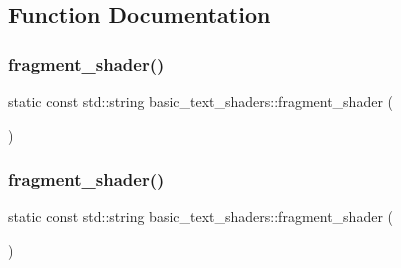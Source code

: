 \subsection{Function Documentation}
\mbox{\label{namespacebasic__text__shaders_a1b36935432456ef648cb7c3704d25a6d}} 
\subsubsection{\texorpdfstring{fragment\+\_\+shader()}{fragment\_shader()}\hspace{0.1cm}{\footnotesize\ttfamily [1/2]}}
{\footnotesize\ttfamily static const std\+::string basic\+\_\+text\+\_\+shaders\+::fragment\+\_\+shader (\begin{DoxyParamCaption}\item[{\{R\char`\"{}(\#version 450 corein vec2 Tex\+Coords;out vec4 color;uniform sampler2D text;uniform vec3 text\+Color;void \mbox{\hyperlink{gtest__tests_8cpp_a3c04138a5bfe5d72780bb7e82a18e627}{main}}()\{vec4 sampled = vec4(1.\+0, 1.\+0, 1.\+0, texture(text, Tex\+Coords).r);color = vec4(text\+Color, 1.\+0) $\ast$ sampled;\})\char`\"{}\}}]{ }\end{DoxyParamCaption})\hspace{0.3cm}{\ttfamily [static]}}

\mbox{\label{namespacebasic__text__shaders_a1b36935432456ef648cb7c3704d25a6d}} 
\subsubsection{\texorpdfstring{fragment\+\_\+shader()}{fragment\_shader()}\hspace{0.1cm}{\footnotesize\ttfamily [2/2]}}
{\footnotesize\ttfamily static const std\+::string basic\+\_\+text\+\_\+shaders\+::fragment\+\_\+shader (\begin{DoxyParamCaption}\item[{\{R\char`\"{}(\#version 450 corein vec2 Tex\+Coords;out vec4 color;uniform sampler2D text;uniform vec3 text\+Color;void \mbox{\hyperlink{gtest__tests_8cpp_a3c04138a5bfe5d72780bb7e82a18e627}{main}}()\{vec4 sampled = vec4(1.\+0, 1.\+0, 1.\+0, texture(text, Tex\+Coords).r);color = vec4(text\+Color, 1.\+0) $\ast$ sampled;\})\char`\"{}\}}]{ }\end{DoxyParamCaption})\hspace{0.3cm}{\ttfamily [static]}}

